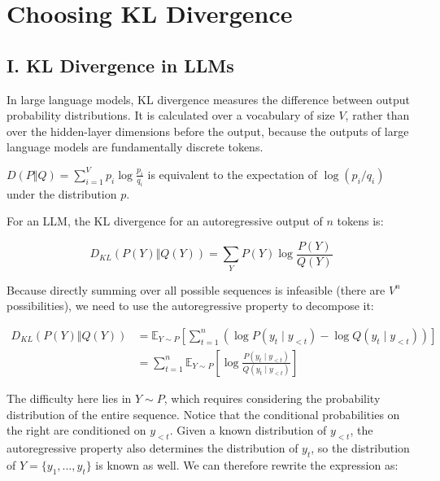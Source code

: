 \setcounter{section}{7}

\hypertarget{choosing-kl-divergence}{%
\section{Choosing KL Divergence}\label{choosing-kl-divergence}}

\hypertarget{i.-kl-divergence-in-llms}{%
\subsection{I. KL Divergence in LLMs}\label{i.-kl-divergence-in-llms}}

In large language models, KL divergence measures the difference between output probability distributions. It is calculated over a vocabulary of size \(V\), rather than over the hidden-layer dimensions before the output, because the outputs of large language models are fundamentally discrete tokens.

\(D(P \Vert Q)=\sum_{i=1}^{V}p_i\log\frac{p_i}{q_i}\) is equivalent to the expectation of \(\log(p_i/q_i)\) under the distribution \(p\).

For an LLM, the KL divergence for an autoregressive output of \(n\) tokens is:

\[
D_{KL}(P(Y) \Vert Q(Y))=\sum_Y P(Y)\log\frac{P(Y)}{Q(Y)}
\]

Because directly summing over all possible sequences is infeasible (there are \(V^n\) possibilities), we need to use the autoregressive property to decompose it:

\[
\begin{aligned}
D_{KL}(P(Y) \Vert Q(Y))
&= \mathbb{E}_{Y\sim P}\left[\sum_{t=1}^{n}\left(\log P(y_t\mid y_{<t})-\log Q(y_t\mid y_{<t})\right)\right] \\
&= \sum_{t=1}^{n}\mathbb{E}_{Y\sim P}\left[\log\frac{P(y_t\mid y_{<t})}{Q(y_t\mid y_{<t})}\right]
\end{aligned}
\]

The difficulty here lies in \(Y\sim P\), which requires considering the probability distribution of the entire sequence. Notice that the conditional probabilities on the right are conditioned on \(y_{<t}\). Given a known distribution of \(y_{<t}\), the autoregressive property also determines the distribution of \(y_t\), so the distribution of \(Y=\{y_1,\ldots,y_t\}\) is known as well. We can therefore rewrite the expression as:

